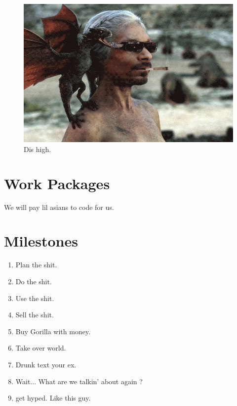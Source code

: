 \documentclass{report}
\begin{document}
	\begin{figure}[h]
	\centering
    \includegraphics[width=\columnwidth]{high.jpg}
	\caption{Dis high.}
\end{figure}

\section{Work Packages}

	We will pay lil asians to code for us. 

\section{Milestones}

\begin{enumerate}
	\item Plan the shit.
	\item Do the shit.
	\item Use the shit.
	\item Sell the shit.
	\item Buy Gorilla with money.
	\item Take over world.
	\item Drunk text your ex.
	\item Wait... What are we talkin' about again ?
	\item get hyped. Like this guy.
\end{enumerate}
\end{document}
